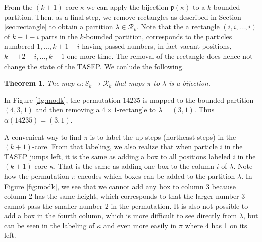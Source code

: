 \documentclass[11pt]{amsart}
\newtheorem{theorem}{Theorem}[section]
\begin{document}
From the $(k+1)$-core $\kappa$ we can apply the bijection $\mathfrak{p}(\kappa)$ to a $k$-bounded partition. Then, as a final step, we remove rectangles as described in 
Section \ref{sec:rectangle} to obtain a partition $\lambda\in \mathcal{R}_k$. Note that the a rectangle $(i,i,\dots,i)$ of $k+1-i$ parts in the $k$-bounded partition, corresponds to the particles numbered $1,\dots,k+1-i$ having passed numbers, in fact vacant positions, $k-+2-i,\dots,k+1$ one more time. The removal of the rectangle does hence not change the state of the TASEP. We conlude the following.

\begin{theorem}
    The map $\alpha :S_k\to \mathcal{R}_k$ that maps $\pi$ to $\lambda$ is a bijection.
\end{theorem}

In Figure \ref{fig:modk}, the permutation $1 4 2 3 5$ is mapped to the bounded partition $(4,3,1)$ and then removing 
a $4\times 1$-rectangle to $\lambda=(3,1)$.
Thus $\alpha(1 4 2 3 5)= (3,1)$.

A convenient way to find $\pi$ is to label the up-steps (northeast steps) in the $(k+1)$-core.
From that labeling, we also realize that when particle $i$ in the TASEP jumps left, it is the same as adding a box to all positions labeled $i$ in the $(k+1)$-core $\kappa$. That is the same as adding one box to the column $i$ of $\lambda$. Note how the permutation $\pi$ encodes which boxes can be added to the partition $\lambda$. In Figure \ref{fig:modk}, we see that we cannot add any box to column 3 because column 2 has the same height, which corresponds to that the larger number 3 cannot pass the smaller number 2 in the permutation. It is also not possible to add a box in the fourth column, which is more difficult to see directly from $\lambda$, but can be seen in the labeling of $\kappa$ and even more easily in $\pi$ where 4 has 1 on its left.
\end{document}

